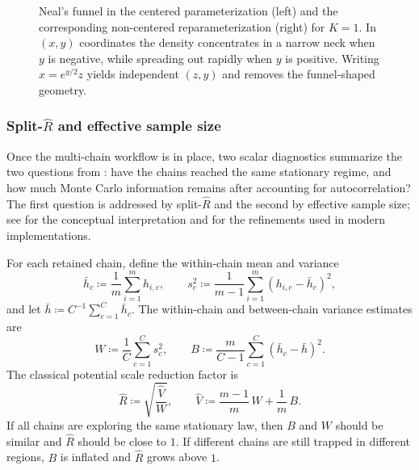 \begin{figure}[t]
  \centering
  
  \caption{Neal's funnel in the centered parameterization (left) and the corresponding non-centered reparameterization (right) for $K=1$.
  In $(x,y)$ coordinates the density concentrates in a narrow neck when $y$ is negative, while spreading out rapidly when $y$ is positive.
  Writing $x=e^{y/2}z$ yields independent $(z,y)$ and removes the funnel-shaped geometry.}
  \label{fig:neals-funnel}
\end{figure}

\subsubsection{\texorpdfstring{Split-$\hat R$ and effective sample size}{Split-R-hat and effective sample size}}

Once the multi-chain workflow is in place, two scalar diagnostics summarize the two questions from : have the chains reached the same stationary regime, and how much Monte Carlo information remains after accounting for autocorrelation?
The first question is addressed by split-$\hat R$ and the second by effective sample size; see \citet[\S2.2--\S2.3]{betancourt_2017_hmc_conceptual} for the conceptual interpretation and \citet[\S\S3.2--4.5]{vehtari_gelman_simpson_carpenter_burkner_2021_rank_normalization} for the refinements used in modern implementations.

For each retained chain, define the within-chain mean and variance
\[
  \bar h_c \coloneqq \frac{1}{m}\sum_{i=1}^m h_{i,c},
  \qquad
  s_c^2 \coloneqq \frac{1}{m-1}\sum_{i=1}^m (h_{i,c}-\bar h_c)^2,
\]
and let $\bar h\coloneqq C^{-1}\sum_{c=1}^C \bar h_c$.
The within-chain and between-chain variance estimates are
\[
  W \coloneqq \frac{1}{C}\sum_{c=1}^C s_c^2,
  \qquad
  B \coloneqq \frac{m}{C-1}\sum_{c=1}^C (\bar h_c-\bar h)^2.
\]
The classical potential scale reduction factor is
\begin{equation}
  \hat R
  \coloneqq
  \sqrt{\frac{\hat V}{W}},
  \qquad
  \hat V \coloneqq \frac{m-1}{m}\,W + \frac{1}{m}\,B.
  \label{eq:rhat}
\end{equation}
If all chains are exploring the same stationary law, then $B$ and $W$ should be similar and $\hat R$ should be close to $1$.
If different chains are still trapped in different regions, $B$ is inflated and $\hat R$ grows above $1$.

